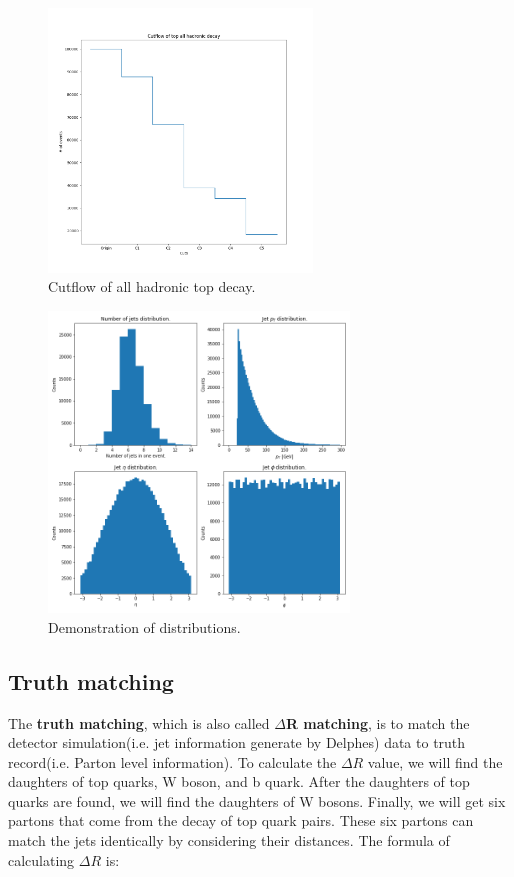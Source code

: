 \begin{figure}[!h]
	\includegraphics[width=0.8\linewidth, height=7cm,keepaspectratio=true]{Figures/ttbar_cutflow.png}
	\caption{Cutflow of all hadronic top decay.}
	\label{fig:cutflow}
\end{figure}
\begin{figure}[H]
	\includegraphics[width=0.8\linewidth, height=8cm,keepaspectratio=true]{Figures/ttbar_kinematic_dist.png}
	\caption{Demonstration of distributions.}
	\label{fig:kinematic dist}
\end{figure}
\newpage

\subsection{Truth matching}\label{subsec:Truth matching}
The \textbf{truth matching}, which is also called \textbf{$\Delta$R matching},  is to match the detector simulation(i.e. jet information generate by Delphes) data to truth record(i.e. Parton level information).  To calculate the $\Delta R$ value, we will find the daughters of top quarks, W boson, and b quark. After the daughters of top quarks are found, we will find the daughters of W bosons. Finally, we will get six partons that come from the decay of top quark pairs. These six partons can match the jets identically by considering their distances. The formula of calculating $\Delta R$ is:

